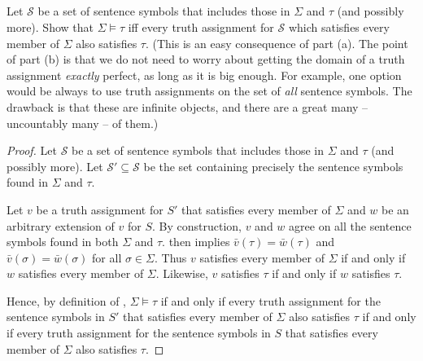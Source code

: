 \documentclass{report}
\begin{document}
\subsection{}%

  Let $\mathcal{S}$ be a set of sentence symbols that includes those in $\Sigma$
    and $\tau$ (and possibly more).
  Show that $\Sigma \vDash \tau$ iff every truth assignment for $\mathcal{S}$
    which satisfies every member of $\Sigma$ also satisfies $\tau$.
  (This is an easy consequence of part (a). The point of part (b) is that we do
    not need to worry about getting the domain of a truth assignment
    \textit{exactly} perfect, as long as it is big enough. For example, one
    option would be always to use truth assignments on the set of \textit{all}
    sentence symbols. The drawback is that these are infinite objects, and there
    are a great many -- uncountably many -- of them.)

  \begin{proof}

    Let $\mathcal{S}$ be a set of sentence symbols that includes those in
      $\Sigma$ and $\tau$ (and possibly more).
    Let $\mathcal{S}' \subseteq \mathcal{S}$ be the set containing precisely
      the sentence symbols found in $\Sigma$ and $\tau$.

    Let $v$ be a truth assignment for $S'$ that satisfies every member of
      $\Sigma$ and $w$ be an arbitrary extension of $v$ for $S$.
    By construction, $v$ and $w$ agree on all the sentence symbols found in both
      $\Sigma$ and $\tau$.
     then implies $\bar{v}(\tau) = \bar{w}(\tau)$
      and $\bar{v}(\sigma) = \bar{w}(\sigma)$ for all $\sigma \in \Sigma$.
    Thus $v$ satisfies every member of $\Sigma$ if and only if $w$ satisfies
      every member of $\Sigma$.
    Likewise, $v$ satisfies $\tau$ if and only if $w$ satisfies $\tau$.

    Hence, by definition of ,
      $\Sigma \vDash \tau$ if and only if every truth assignment for the
      sentence symbols in $S'$ that satisfies every member of $\Sigma$ also
      satisfies $\tau$ if and only if every truth assignment for the sentence
      symbols in $S$ that satisfies every member of $\Sigma$ also satisfies
      $\tau$.

  \end{proof}

\subsection{}%
\end{document}
